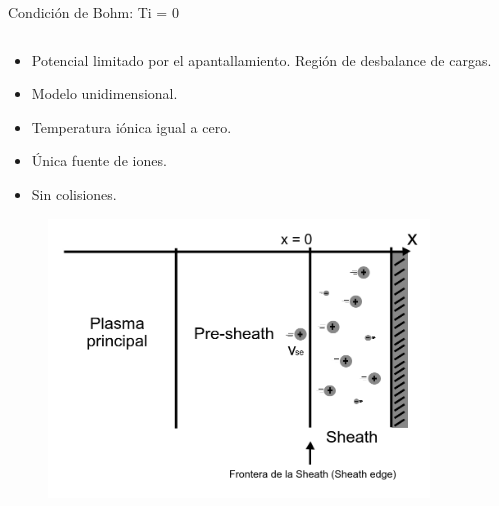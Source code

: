 \documentclass[11pt]{beamer}
\begin{document}
        \begin{frame}[t]{Condici\'on de Bohm: Ti = 0}
        \fontsize{7pt}{9}\selectfont
        \begin{columns}[t]
        \begin{column}{0.4\textwidth}
        \begin{itemize}
            \item Potencial limitado por el apantallamiento. Región de desbalance de cargas.
            \item Modelo unidimensional.
            \item Temperatura iónica igual a cero.
            \item \'Unica fuente de iones.
            \item Sin colisiones.
        \end{itemize}
        \begin{figure}
        \centering
        \includegraphics[width=0.9\textwidth]{sheath_edge.jpg}
        \label{fig:regiones}
        \end{figure}
        \end{column}
        

\end{columns}
\end{frame}
\end{document}
